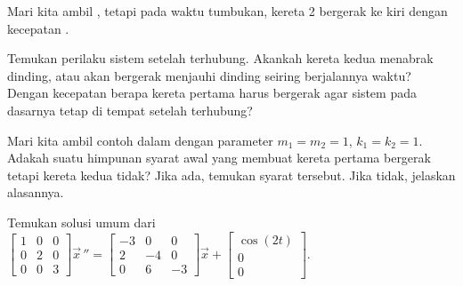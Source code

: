 \begin{exercise}
Mari kita ambil , tetapi pada
waktu tumbukan, kereta 2 bergerak ke kiri dengan kecepatan
.
\begin{tasks}
\task
Temukan perilaku sistem setelah terhubung.
\task
Akankah kereta kedua menabrak
dinding, atau akan bergerak menjauhi dinding seiring berjalannya waktu?
\task
Dengan kecepatan
berapa kereta pertama harus bergerak agar sistem
pada dasarnya tetap di tempat setelah terhubung?
\end{tasks}
\end{exercise}

\begin{exercise}
Mari kita ambil contoh dalam  dengan
parameter
$m_1 = m_2 = 1$, $k_1 = k_2 = 1$.  Adakah suatu himpunan syarat
awal yang membuat kereta pertama bergerak tetapi kereta kedua tidak?
Jika ada, temukan syarat tersebut.  Jika tidak, jelaskan alasannya.
\end{exercise}

\setcounter{exercise}{100}

\begin{exercise}
Temukan solusi umum dari
$\left[ \begin{smallmatrix}
1 & 0 & 0\\
0 & 2 & 0\\
0 & 0 & 3
\end{smallmatrix}\right]
\vec{x}\,''
=
\left[ \begin{smallmatrix}
-3 & 0 & 0 \\
2 & -4 & 0 \\
0 & 6 & -3
\end{smallmatrix}\right]
\vec{x}
+ 
\left[ \begin{smallmatrix}
\cos(2t) \\ 0 \\ 0
\end{smallmatrix}\right]$.
\end{exercise}


